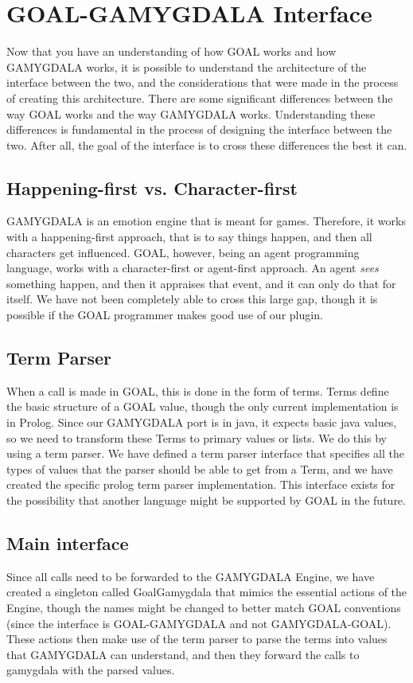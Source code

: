 \section{GOAL-GAMYGDALA Interface}
Now that you have an understanding of how GOAL works and how GAMYGDALA works, it is possible to understand the architecture of the interface between the two, and the considerations that were made in the process of creating this architecture.
There are some significant differences between the way GOAL works and the way GAMYGDALA works. Understanding these differences is fundamental in the process of designing the interface between the two. After all, the goal of the interface is to cross these differences the best it can.

\subsection{Happening-first vs. Character-first}
GAMYGDALA is an emotion engine that is meant for games. Therefore, it works with a happening-first approach, that is to say things happen, and then all characters get influenced. GOAL, however, being an agent programming language, works with a character-first or agent-first approach. An agent \emph{sees} something happen, and then it appraises that event, and it can only do that for itself. We have not been completely able to cross this large gap, though it is possible if the GOAL programmer makes good use of our plugin.

\subsection{Term Parser}
When a call is made in GOAL, this is done in the form of terms. Terms define the basic structure of a GOAL value, though the only current implementation is in Prolog. Since our GAMYGDALA port is in java, it expects basic java values, so we need to transform these Terms to primary values or lists. We do this by using a term parser.
We have defined a term parser interface that specifies all the types of values that the parser should be able to get from a Term, and we have created the specific prolog term parser implementation. This interface exists for the possibility that another language might be supported by GOAL in the future.

\subsection{Main interface}
Since all calls need to be forwarded to the GAMYGDALA Engine, we have created a singleton called GoalGamygdala that mimics the essential actions of the Engine, though the names might be changed to better match GOAL conventions (since the interface is GOAL-GAMYGDALA and not GAMYGDALA-GOAL). These actions then make use of the term parser to parse the terms into values that GAMYGDALA can understand, and then they forward the calls to gamygdala with the parsed values.

